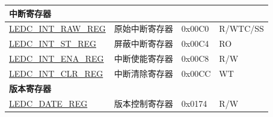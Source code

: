 \begin{longtable}{ | p{5.5cm} | p{6.8cm} | p{1.3cm} | p{2cm} | }
\multicolumn{4}{|l|}{\textbf{中断寄存器}} \\ \hline
\hyperref[regdesc:LEDCINTRAWREG]{LEDC\_INT\_RAW\_REG} & 原始中断寄存器 & 0x00C0 & R/WTC/SS \\ \hline
\hyperref[regdesc:LEDCINTSTREG]{LEDC\_INT\_ST\_REG} & 屏蔽中断寄存器 & 0x00C4 & RO \\ \hline
\hyperref[regdesc:LEDCINTENAREG]{LEDC\_INT\_ENA\_REG} & 中断使能寄存器 & 0x00C8 & R/W \\ \hline
\hyperref[regdesc:LEDCINTCLRREG]{LEDC\_INT\_CLR\_REG} & 中断清除寄存器 & 0x00CC & WT \\ \hline
\multicolumn{4}{|l|}{\textbf{版本寄存器}} \\ \hline
\hyperref[regdesc:LEDCDATEREG]{LEDC\_DATE\_REG} & 版本控制寄存器 & 0x0174 & R/W \\ \hline
\end{longtable}
